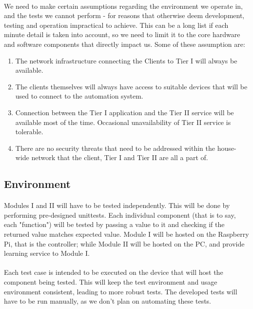 \paragraph{}
We need to make certain assumptions regarding the environment we operate in, and the tests we cannot perform - for reasons that otherwise deem development, testing and operation impractical to achieve. This can be a long list if each minute detail is taken into account, so we need to limit it to the core hardware and software components that directly impact us. Some of these assumption are:
\begin{enumerate}
\item The network infrastructure connecting the Clients to Tier I will always be available.
\item The clients themselves will always have access to suitable devices that will be used to connect to the automation system.
\item Connection between the Tier I application and the Tier II service will be available most of the time. Occasional unavailability of Tier II service is tolerable.
\item There are no security threats that need to be addressed within the house-wide network that the client, Tier I and Tier II are all a part of.
\end{enumerate}

\subsection{Environment}
\paragraph{}
Modules I and II will have to be tested independently. This will be done by performing pre-designed unittests. Each individual component (that is to say, each "function") will be tested by passing a value to it and checking if the returned value matches expected value. Module I will be hosted on the Raspberry Pi, that is the controller; while Module II will be hosted on the PC, and provide learning service to Module I.
\paragraph{}
Each test case is intended to be executed on the device that will host the component being tested. This will keep the test environment and usage environment consistent, leading to more robust tests. The developed tests will have to be run manually, as we don't plan on automating these tests.

